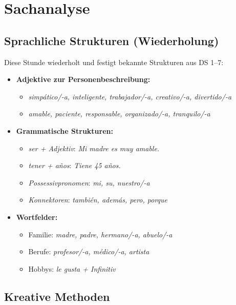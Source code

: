 \documentclass[11pt,a4paper]{article}
\begin{document}
\section{Sachanalyse}

\subsection{Sprachliche Strukturen (Wiederholung)}

Diese Stunde wiederholt und festigt bekannte Strukturen aus DS 1--7:

\begin{itemize}
    \item \textbf{Adjektive zur Personenbeschreibung:}
    \begin{itemize}
        \item \textit{simpático/-a, inteligente, trabajador/-a, creativo/-a, divertido/-a}
        \item \textit{amable, paciente, responsable, organizado/-a, tranquilo/-a}
    \end{itemize}

    \item \textbf{Grammatische Strukturen:}
    \begin{itemize}
        \item \textit{ser + Adjektiv}: \textit{Mi madre es muy amable.}
        \item \textit{tener + años}: \textit{Tiene 45 años.}
        \item \textit{Possessivpronomen}: \textit{mi, su, nuestro/-a}
        \item \textit{Konnektoren}: \textit{también, además, pero, porque}
    \end{itemize}

    \item \textbf{Wortfelder:}
    \begin{itemize}
        \item Familie: \textit{madre, padre, hermano/-a, abuelo/-a}
        \item Berufe: \textit{profesor/-a, médico/-a, artista}
        \item Hobbys: \textit{le gusta + Infinitiv}
    \end{itemize}
\end{itemize}

\subsection{Kreative Methoden}
\end{document}
